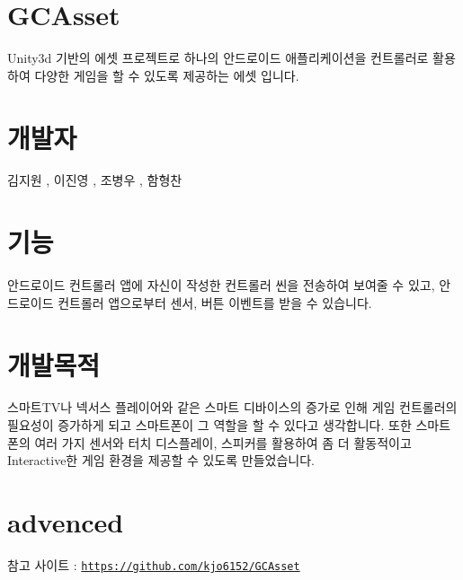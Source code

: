 \hypertarget{index_intro}{}\section{G\+C\+Asset}\label{index_intro}

\begin{DoxyItemize}
\item Unity3d 기반의 에셋 프로젝트로 하나의 안드로이드 애플리케이션을 컨트롤러로 활용하여 다양한 게임을 할 수 있도록 제공하는 에셋 입니다. 
\end{DoxyItemize}\hypertarget{index_developer}{}\section{개발자}\label{index_developer}

\begin{DoxyItemize}
\item 김지원 , 이진영 , 조병우 , 함형찬 
\end{DoxyItemize}\hypertarget{index_Program}{}\section{기능}\label{index_Program}

\begin{DoxyItemize}
\item 안드로이드 컨트롤러 앱에 자신이 작성한 컨트롤러 씬을 전송하여 보여줄 수 있고, 안드로이드 컨트롤러 앱으로부터 센서, 버튼 이벤트를 받을 수 있습니다. 
\end{DoxyItemize}\hypertarget{index_info}{}\section{개발목적}\label{index_info}

\begin{DoxyItemize}
\item 스마트\+T\+V나 넥서스 플레이어와 같은 스마트 디바이스의 증가로 인해 게임 컨트롤러의 필요성이 증가하게 되고 스마트폰이 그 역할을 할 수 있다고 생각합니다. 또한 스마트폰의 여러 가지 센서와 터치 디스플레이, 스피커를 활용하여 좀 더 활동적이고 Interactive한 게임 환경을 제공할 수 있도록 만들었습니다. 
\end{DoxyItemize}\hypertarget{index_advenced}{}\section{advenced}\label{index_advenced}

\begin{DoxyItemize}
\item 참고 사이트 \+: \href{https://github.com/kjo6152/GCAsset}{\tt https\+://github.\+com/kjo6152/\+G\+C\+Asset} 
\end{DoxyItemize}